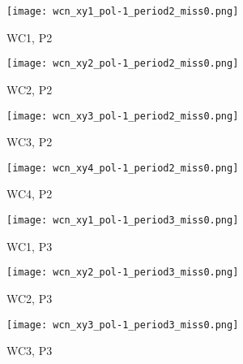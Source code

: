          \begin{figure}[h]	   
            \centering
   
               \begin{subfigure}[b]{0.23\textwidth}
            \centering
            \texttt{[image: wcn\_xy1\_pol-1\_period2\_miss0.png]}
            \caption{WC1, P2}
            \label{fig_wc1_p2}
            \end{subfigure}
            \hfill             
             \begin{subfigure}[b]{0.23\textwidth}
            \centering
            \texttt{[image: wcn\_xy2\_pol-1\_period2\_miss0.png]}
            \caption{WC2, P2}
            \label{fig_wc2_p2}
            \end{subfigure}
            \hfill 
              \begin{subfigure}[b]{0.23\textwidth}
            \centering
            \texttt{[image: wcn\_xy3\_pol-1\_period2\_miss0.png]}
            \caption{WC3, P2}
            \label{fig_wc3_p2}
            \end{subfigure}
            \hfill    
             \begin{subfigure}[b]{0.23\textwidth}
            \centering
            \texttt{[image: wcn\_xy4\_pol-1\_period2\_miss0.png]}
            \caption{WC4, P2}
            \label{fig_wc4_p2}
            \end{subfigure}
            \hfill
               \begin{subfigure}[b]{0.23\textwidth}
            \centering
            \texttt{[image: wcn\_xy1\_pol-1\_period3\_miss0.png]}
            \caption{WC1, P3}
            \label{fig_wc1_p3}
            \end{subfigure}
            \hfill             
             \begin{subfigure}[b]{0.23\textwidth}
            \centering
            \texttt{[image: wcn\_xy2\_pol-1\_period3\_miss0.png]}
            \caption{WC2, P3}
            \label{fig_wc2_p3}
            \end{subfigure}
            \hfill 
              \begin{subfigure}[b]{0.23\textwidth}
            \centering
            \texttt{[image: wcn\_xy3\_pol-1\_period3\_miss0.png]}
            \caption{WC3, P3}
            \label{fig_wc3_p3}
            \end{subfigure}
            \hfill    
             \begin{subfigure}[b]{0.23\textwidth}

\end{subfigure}
\end{figure}
